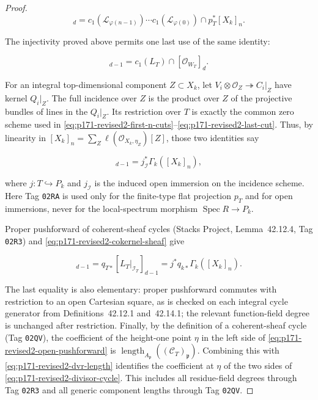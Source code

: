 \begin{proof}
\begin{equation}
 [\mathcal O_{W_T}]_d
 =c_1(\mathcal L_{\varphi(n-1)})\cdots
  c_1(\mathcal L_{\varphi(0)})\cap p_T^*[X_k]_n.
 \label{eq:p171-revised2-first-n-cuts}
\end{equation}

The injectivity proved above permits one last use of the same identity:

\begin{equation}
 [L_T|_{\mathcal I_T}]_{d-1}
 =c_1(L_T)\cap[\mathcal O_{W_T}]_d.
 \label{eq:p171-revised2-last-cut}
\end{equation}

For an integral top-dimensional component \(Z\subset X_k\), let
\(V_i\otimes\mathcal O_Z\twoheadrightarrow C_i|_Z\) have kernel
\(Q_i|_Z\).  The full incidence over \(Z\) is the product over \(Z\) of
the projective bundles of lines in the \(Q_i|_Z\).  Its restriction over
\(T\) is exactly the common zero scheme used in
\eqref{eq:p171-revised2-first-n-cuts}--\eqref{eq:p171-revised2-last-cut}.
Thus, by linearity in
\([X_k]_n=\sum_Z\ell(\mathcal O_{X_k,\eta_Z})[Z]\), those two identities
say

\begin{equation}
 [L_T|_{\mathcal I_T}]_{d-1}
 =j_{\mathcal I}^*\Gamma_k([X_k]_n),
 \label{eq:p171-revised2-incidence-restriction}
\end{equation}

where \(j:T\hookrightarrow P_k\) and \(j_{\mathcal I}\) is the induced
open immersion on the incidence scheme.  Here Tag \texttt{02RA} is used
only for the finite-type flat projection \(p_T\) and for open immersions,
never for the local-spectrum morphism
\(\operatorname{Spec}R\to P_k\).

Proper pushforward of coherent-sheaf cycles (Stacks Project,
Lemma~42.12.4, Tag \texttt{02R3}) and
\eqref{eq:p171-revised2-cokernel-sheaf} give

\begin{equation}
 [\mathcal C_T]_{d-1}
 =q_{T*}[L_T|_{\mathcal I_T}]_{d-1}
 =j^*q_{k*}\Gamma_k([X_k]_n).
 \label{eq:p171-revised2-open-pushforward}
\end{equation}

The last equality is also elementary: proper pushforward commutes with
restriction to an open Cartesian square, as is checked on each integral
cycle generator from Definitions~42.12.1 and~42.14.1; the relevant
function-field degree is unchanged after restriction.  Finally, by the
definition of a coherent-sheaf cycle (Tag \texttt{02QV}), the coefficient
of the height-one point \(\eta\) in the left side of
\eqref{eq:p171-revised2-open-pushforward} is
\(\operatorname{length}_{A_\mathfrak p}((\mathcal C_T)_\mathfrak p)\).
Combining this with \eqref{eq:p171-revised2-dvr-length} identifies the
coefficient at \(\eta\) of the two sides of
\eqref{eq:p171-revised2-divisor-cycle}.  This includes all residue-field
degrees through Tag \texttt{02R3} and all generic component lengths through
Tag \texttt{02QV}.


\end{proof}
